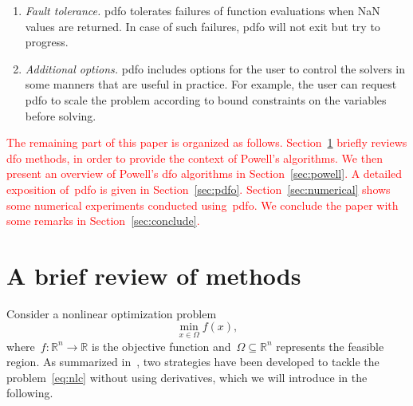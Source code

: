 \documentclass[
    smallextended,  %
    final,          %
]{svjour3}
\newcommand{\R}{\mathbb{R}}
\newcommand{\fset}{\Omega}
\newcommand{\obj}{f}
\newcommand{\red}{\textcolor{red}}
\begin{document}
\begin{enumerate}
    \item \emph{Fault tolerance.}
    \gls{pdfo} tolerates failures of function evaluations when NaN values are returned.
    In case of such failures, \gls{pdfo} will not exit but try to progress.

    \item \emph{Additional options.}
    \gls{pdfo} includes options for the user to control the solvers in some manners that are useful in practice.
    For example, the user can request \gls{pdfo} to scale the problem according to bound constraints on the variables before solving.
\end{enumerate}

\red{
The remaining part of this paper is organized as follows.
Section~\ref{sec:dfo} briefly reviews \gls{dfo} methods, in order to provide the context of Powell's algorithms.
We then present an overview of Powell's \gls{dfo} algorithms in Section~\ref{sec:powell}.
A detailed exposition of~\gls{pdfo} is given in Section~\ref{sec:pdfo}.
Section~\ref{sec:numerical} shows some numerical experiments conducted using~\gls{pdfo}.
We conclude the paper with some remarks in Section~\ref{sec:conclude}.
}

\section{A brief review of  methods}
\label{sec:dfo}

Consider a nonlinear optimization problem
\begin{equation}
    \label{eq:nlc}
    \min_{x \in \fset} \obj(x),
\end{equation}
where~$\obj : \R^n \to \R$ is the objective function and~$\fset \subseteq \R^n$ represents the feasible region.
As summarized in~\cite{Conn_Scheinberg_Vicente_2009b}, two strategies have been developed to tackle
the problem~\eqref{eq:nlc} without using derivatives, which we will introduce in the following.
\end{document}
